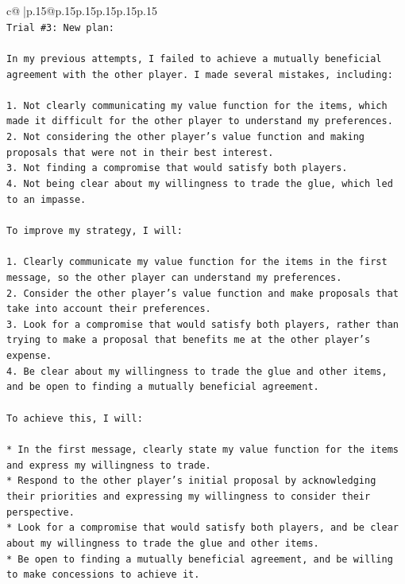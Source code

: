 \documentclass{article}
\begin{document}
{\begin{supertabular}{c@{$\;$}|p{.15\linewidth}@{}p{.15\linewidth}p{.15\linewidth}p{.15\linewidth}p{.15\linewidth}p{.15\linewidth}}
{{{\\ 
\texttt{Trial \#3: New plan: } \\
\\ 
\texttt{In my previous attempts, I failed to achieve a mutually beneficial agreement with the other player. I made several mistakes, including:} \\
\\ 
\texttt{1. Not clearly communicating my value function for the items, which made it difficult for the other player to understand my preferences.} \\
\texttt{2. Not considering the other player's value function and making proposals that were not in their best interest.} \\
\texttt{3. Not finding a compromise that would satisfy both players.} \\
\texttt{4. Not being clear about my willingness to trade the glue, which led to an impasse.} \\
\\ 
\texttt{To improve my strategy, I will:} \\
\\ 
\texttt{1. Clearly communicate my value function for the items in the first message, so the other player can understand my preferences.} \\
\texttt{2. Consider the other player's value function and make proposals that take into account their preferences.} \\
\texttt{3. Look for a compromise that would satisfy both players, rather than trying to make a proposal that benefits me at the other player's expense.} \\
\texttt{4. Be clear about my willingness to trade the glue and other items, and be open to finding a mutually beneficial agreement.} \\
\\ 
\texttt{To achieve this, I will:} \\
\\ 
\texttt{* In the first message, clearly state my value function for the items and express my willingness to trade.} \\
\texttt{* Respond to the other player's initial proposal by acknowledging their priorities and expressing my willingness to consider their perspective.} \\
\texttt{* Look for a compromise that would satisfy both players, and be clear about my willingness to trade the glue and other items.} \\
\texttt{* Be open to finding a mutually beneficial agreement, and be willing to make concessions to achieve it.} \\
}}}
\end{supertabular}}
\end{document}
